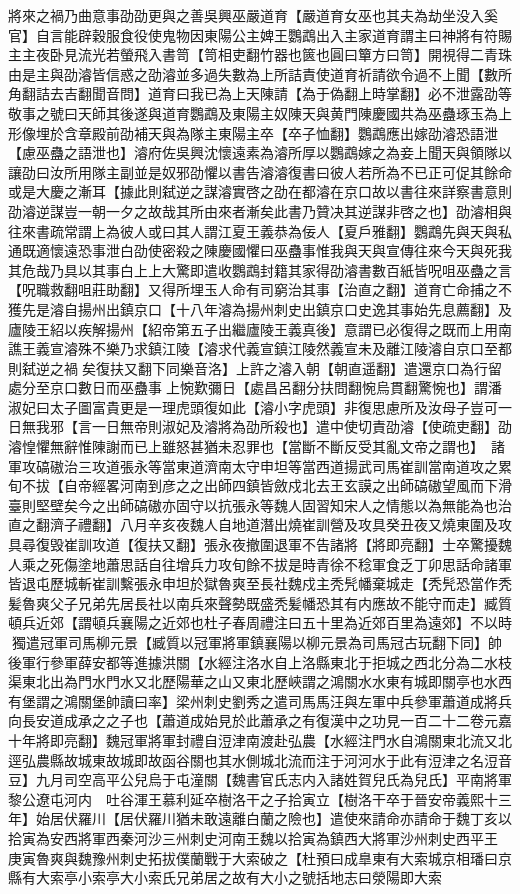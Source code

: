 將來之禍乃曲意事劭劭更與之善吳興巫嚴道育【嚴道育女巫也其夫為劫坐没入奚官】自言能辟穀服食役使鬼物因東陽公主婢王鸚鵡出入主家道育謂主曰神將有符賜主主夜卧見流光若螢飛入書笥【笥相吏翻竹器也篋也圓曰簞方曰笥】開視得二青珠由是主與劭濬皆信惑之劭濬並多過失數為上所詰責使道育祈請欲令過不上聞【數所角翻詰去吉翻聞音問】道育曰我已為上天陳請【為于偽翻上時掌翻】必不泄露劭等敬事之號曰天師其後遂與道育鸚鵡及東陽主奴陳天與黄門陳慶國共為巫蠱琢玉為上形像埋於含章殿前劭補天與為隊主東陽主卒【卒子恤翻】鸚鵡應出嫁劭濬恐語泄【慮巫蠱之語泄也】濬府佐吳興沈懷遠素為濬所厚以鸚鵡嫁之為妾上聞天與領隊以讓劭曰汝所用隊主副並是奴邪劭懼以書告濬濬復書曰彼人若所為不已正可促其餘命或是大慶之漸耳【據此則弑逆之謀濬實啓之劭在都濬在京口故以書往來詳察書意則劭濬逆謀豈一朝一夕之故哉其所由來者漸矣此書乃贊决其逆謀非啓之也】劭濬相與往來書疏常謂上為彼人或曰其人謂江夏王義恭為佞人【夏戶雅翻】鸚鵡先與天與私通既適懷遠恐事泄白劭使密殺之陳慶國懼曰巫蠱事惟我與天與宣傳往來今天與死我其危哉乃具以其事白上上大驚即遣收鸚鵡封籍其家得劭濬書數百紙皆呪咀巫蠱之言【呪職救翻咀莊助翻】又得所埋玉人命有司窮治其事【治直之翻】道育亡命捕之不獲先是濬自揚州出鎮京口【十八年濬為揚州刺史出鎮京口史逸其事始先息薦翻】及廬陵王紹以疾解揚州【紹帝第五子出繼廬陵王義真後】意謂已必復得之既而上用南譙王義宣濬殊不樂乃求鎮江陵【濬求代義宣鎮江陵然義宣未及離江陵濬自京口至都則弑逆之禍矣復扶又翻下同樂音洛】上許之濬入朝【朝直遥翻】遣還京口為行留處分至京口數日而巫蠱事上惋歎彌日【處昌呂翻分扶問翻惋烏貫翻驚惋也】謂潘淑妃曰太子圖富貴更是一理虎頭復如此【濬小字虎頭】非復思慮所及汝母子豈可一日無我邪【言一日無帝則淑妃及濬將為劭所殺也】遣中使切責劭濬【使疏吏翻】劭濬惶懼無辭惟陳謝而已上雖怒甚猶未忍罪也【當斷不斷反受其亂文帝之謂也】　諸軍攻碻磝治三攻道張永等當東道濟南太守申坦等當西道揚武司馬崔訓當南道攻之累旬不拔【自帝經畧河南到彦之之出師四鎮皆斂戍北去王玄謨之出師碻磝望風而下滑臺則堅壁矣今之出師碻磝亦固守以抗張永等魏人固習知宋人之情態以為無能為也治直之翻濟子禮翻】八月辛亥夜魏人自地道潛出燒崔訓營及攻具癸丑夜又燒東圍及攻具尋復毁崔訓攻道【復扶又翻】張永夜撤圍退軍不告諸將【將即亮翻】士卒驚擾魏人乘之死傷塗地蕭思話自往增兵力攻旬餘不拔是時青徐不稔軍食乏丁卯思話命諸軍皆退屯歷城斬崔訓繫張永申坦於獄魯爽至長社魏戍主秃髠幡棄城走【秃髠恐當作秃髪魯爽父子兄弟先居長社以南兵來聲勢既盛秃髪幡恐其有内應故不能守而走】臧質頓兵近郊【謂頓兵襄陽之近郊也杜子春周禮注曰五十里為近郊百里為遠郊】不以時獨遣冠軍司馬柳元景【臧質以冠軍將軍鎮襄陽以柳元景為司馬冠古玩翻下同】帥後軍行參軍薛安都等進據洪關【水經注洛水自上洛縣東北于拒城之西北分為二水枝渠東北出為門水門水又北歷陽華之山又東北歷峽謂之鴻關水水東有城即關亭也水西有堡謂之鴻關堡帥讀曰率】梁州刺史劉秀之遣司馬馬汪與左軍中兵參軍蕭道成將兵向長安道成承之之子也【蕭道成始見於此蕭承之有復漢中之功見一百二十二卷元嘉十年將即亮翻】魏冠軍將軍封禮自浢津南渡赴弘農【水經注門水自鴻關東北流又北逕弘農縣故城東故城即故函谷關也其水側城北流而注于河河水于此有浢津之名浢音豆】九月司空高平公兒烏于屯潼關【魏書官氏志内入諸姓賀兒氏為兒氏】平南將軍黎公遼屯河内　吐谷渾王慕利延卒樹洛干之子拾寅立【樹洛干卒于晉安帝義熙十三年】始居伏羅川【居伏羅川猶未敢遠離白蘭之險也】遣使來請命亦請命于魏丁亥以拾寅為安西將軍西秦河沙三州刺史河南王魏以拾寅為鎮西大將軍沙州刺史西平王　庚寅魯爽與魏豫州刺史拓拔僕蘭戰于大索破之【杜預曰成臯東有大索城京相璠曰京縣有大索亭小索亭大小索氏兄弟居之故有大小之號括地志曰滎陽即大索
